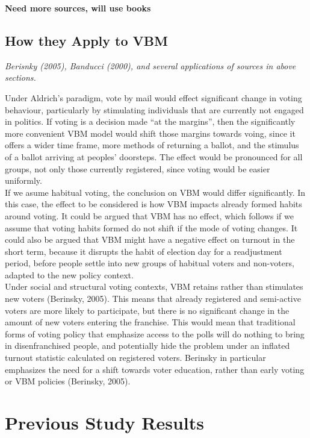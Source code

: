 \documentclass[12pt,twoside]{reedthesis}
\begin{document}
  \textbf{Need more sources, will use books}
  
  \subsection{How they Apply to VBM}\label{how-they-apply-to-vbm}
  
  \emph{Berisnky (2005), Banducci (2000), and several applications of
  sources in above sections.}
  
  Under Aldrich's paradigm, vote by mail would effect significant change
  in voting behaviour, particularly by stimulating individuals that are
  currently not engaged in politics. If voting is a decision made ``at the
  margins'', then the significantly more convenient VBM model would shift
  those margins towards voing, since it offers a wider time frame, more
  methods of returning a ballot, and the stimulus of a ballot arriving at
  peoples' doorsteps. The effect would be pronounced for all groups, not
  only those currently registered, since voting would be easier
  uniformly.\\
  If we asume habitual voting, the conclusion on VBM would differ
  significantly. In this case, the effect to be considered is how VBM
  impacts already formed habits around voting. It could be argued that VBM
  has no effect, which follows if we assume that voting habits formed do
  not shift if the mode of voting changes. It could also be argued that
  VBM might have a negative effect on turnout in the short term, because
  it disrupts the habit of election day for a readjustment period, before
  people settle into new groups of habitual voters and non-voters, adapted
  to the new policy context.\\
  Under social and structural voting contexts, VBM retains rather than
  stimulates new voters (Berinsky, 2005). This means that already
  registered and semi-active voters are more likely to participate, but
  there is no significant change in the amount of new voters entering the
  franchise. This would mean that traditional forms of voting policy that
  emphasize access to the polls will do nothing to bring in
  disenfranchised people, and potentially hide the problem under an
  inflated turnout statistic calculated on registered voters. Berinsky in
  particular emphasizes the need for a shift towards voter education,
  rather than early voting or VBM policies (Berinsky, 2005).
  
  \section{Previous Study Results}\label{previous-study-results}
  
\end{document}
